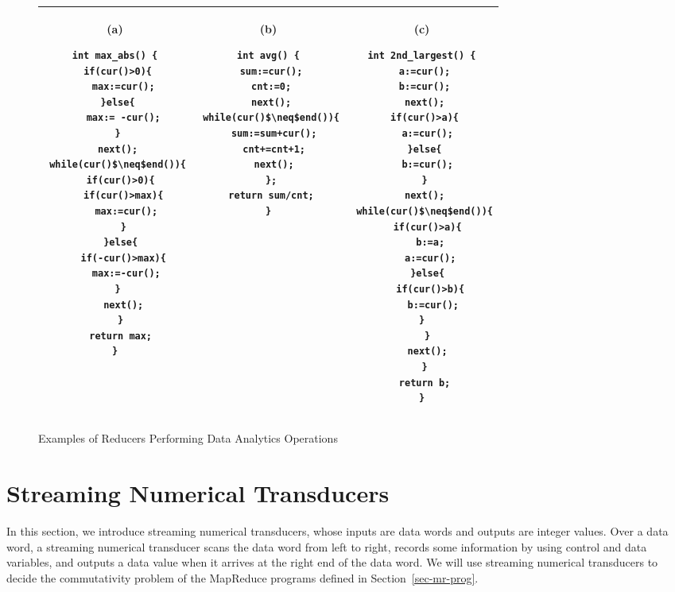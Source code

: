 \documentclass[runningheads,a4paper]{llncs}
\begin{document}
\begin{figure}
	\centering
	\lstset{language=C,
		basicstyle=\ttfamily\scriptsize}
	\begin{tabular}{|c|c|c|}
\hline
		\begin{minipage}[t]{0.28\textwidth}
			(a)
			\begin{lstlisting}[mathescape=true]
int max_abs() {
 if(cur()>0){
   max:=cur();
 }else{
   max:= -cur();
 }
 next();
 while(cur()$\neq$end()){
  if(cur()>0){
   if(cur()>max){
    max:=cur();
   }
  }else{
   if(-cur()>max){
    max:=-cur();
   }  
   next();
  }
  return max;
}
			\end{lstlisting}
		\end{minipage}&
		\begin{minipage}[t]{0.28\textwidth}
			(b)
			\begin{lstlisting}[mathescape=true]
int avg() {
 sum:=cur();
 cnt:=0;
 next();
 while(cur()$\neq$end()){
  sum:=sum+cur();
  cnt+=cnt+1;
  next();
 };
 return sum/cnt;
}
			\end{lstlisting}
		\end{minipage}&
		\begin{minipage}[t]{0.29\textwidth}
		(c) 
	\begin{lstlisting}[mathescape=true]
int 2nd_largest() {
 a:=cur();
 b:=cur();
 next();
 if(cur()>a){
  a:=cur();
 }else{
  b:=cur();
 }
 next();
 while(cur()$\neq$end()){
  if(cur()>a){
   b:=a;
   a:=cur();
  }else{
   if(cur()>b){
    b:=cur();
   }   
  }
  next();
 }
 return b;
}
	\end{lstlisting}		
		\end{minipage}\\
\hline		
	\end{tabular}
	\label{fig:examples}
	\caption{Examples of Reducers Performing Data Analytics Operations}
\end{figure}




\section{Streaming Numerical Transducers}\label{sec-def-snt}

In this section, we introduce streaming numerical transducers, whose inputs are data words and outputs are integer values. Over a data word, a streaming numerical transducer scans the data word from left to right, records some information by using control and data variables, and outputs a data value when it arrives at the right end of the data word. We will use streaming numerical transducers to decide the commutativity problem of the MapReduce programs defined in Section~\ref{sec-mr-prog}.
\end{document}
